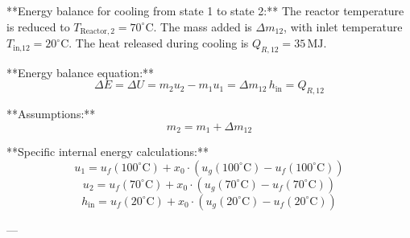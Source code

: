 **Energy balance for cooling from state 1 to state 2:**  
The reactor temperature is reduced to \( T_{\text{Reactor},2} = 70^\circ\text{C} \).  
The mass added is \( \Delta m_{12} \), with inlet temperature \( T_{\text{in,12}} = 20^\circ\text{C} \).  
The heat released during cooling is \( Q_{R,12} = 35 \, \text{MJ} \).  

**Energy balance equation:**  
\[
\Delta E = \Delta U = m_2 u_2 - m_1 u_1 = \Delta m_{12} \, h_{\text{in}} = Q_{R,12}
\]  

**Assumptions:**  
\[
m_2 = m_1 + \Delta m_{12}
\]  

**Specific internal energy calculations:**  
\[
u_1 = u_f(100^\circ\text{C}) + x_0 \cdot \left( u_g(100^\circ\text{C}) - u_f(100^\circ\text{C}) \right)
\]  
\[
u_2 = u_f(70^\circ\text{C}) + x_0 \cdot \left( u_g(70^\circ\text{C}) - u_f(70^\circ\text{C}) \right)
\]  
\[
h_{\text{in}} = u_f(20^\circ\text{C}) + x_0 \cdot \left( u_g(20^\circ\text{C}) - u_f(20^\circ\text{C}) \right)
\]  

---